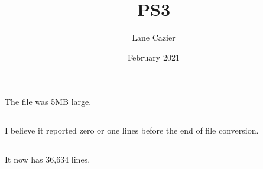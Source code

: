 \documentclass{article}
\title{PS3}
\author{Lane Cazier }
\date{February 2021}
\begin{document}
\maketitle

\subsection{}{ The file was 5MB large.}
\subsection{}{ I believe it reported zero or one lines before the end of file conversion.}
\subsection{}{It now has 36,634 lines.}
\end{document}
